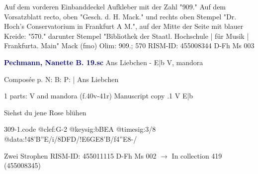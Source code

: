\documentclass[twocolumn]{book}
\begin{document}
\newline Auf dem vorderen Einbanddeckel Aufkleber mit der Zahl "909."
\newline Auf dem Vorsatzblatt recto, oben "Gesch. d. H. Mack." und rechts oben Stempel "Dr. Hoch's Conservatorium in Frankfurt A M.", auf der Mitte der Seite mit blauer Kreide: "570." darunter Stempel "Bibliothek der Staatl. Hochschule | für Musik | Frankfurta. Main"
\newline Mack  (fmo)
\newline Olim: 909.; 570
\newline RISM-ID: 455008344
\newline D-Fh  Ms 003
\newline \par \vspace{7pt} \textcolor{darkblue}{\textbf{Pechmann, Nanette B.  19.sc}}
\newline Ans Liebchen - E|b
\newline V, mandora
\newline \begin{itshape}[heading, f.40v:] Composée p. N: B: P: | Ans Liebchen\end{itshape} 
\newline \textcolor{darkblue}{}  1 parts: V and mandora  (f.40v-41r)
\newline Manuscript copy
.1  V  E|b
\newline \begin{footnotesize} Siehst du jene Rose blühen \end{footnotesize}  
\begin{filecontents*}{309-1.code}
@clef:G-2
@keysig:bBEA
@timesig:3/8
@data:!48'B''E/i/{8DFD}/!E{6GE}8'B/f4''E8-/
\end{filecontents*}
\newline
%

\newline Zwei Strophen
\newline RISM-ID: 455011115
\newline D-Fh  Ms 002
\newline $\rightarrow$ In collection 419 (455008345)
      
\end{document}
